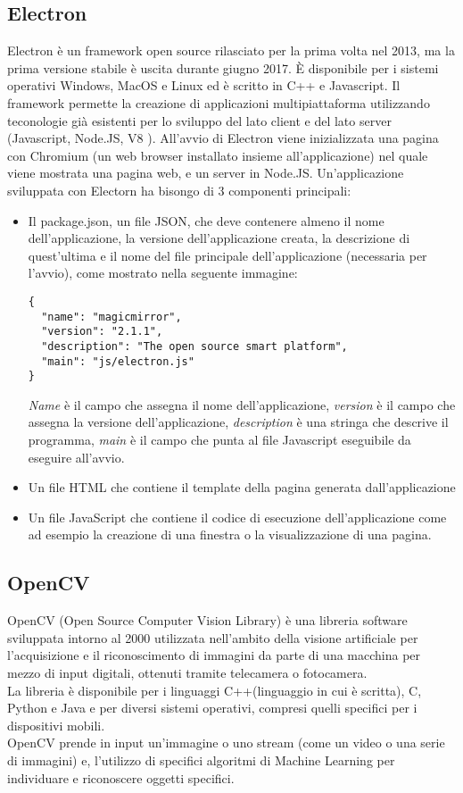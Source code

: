 \subsection{Electron}\label{cap:Electron}
Electron \`e un framework open source rilasciato per la prima volta nel 2013, ma la prima versione
stabile \`e uscita durante giugno 2017. \`E disponibile per i sistemi operativi Windows, MacOS e Linux ed \`e scritto
in C++ e Javascript. Il framework permette la creazione di applicazioni multipiattaforma
utilizzando teconologie gi\`a esistenti per lo sviluppo
del lato client e del lato server (Javascript, Node.JS, V8 \cite{V8}).
All'avvio di Electron viene inizializzata una pagina con Chromium \cite{Chromium}(un web browser installato insieme all'applicazione)
nel quale viene mostrata una pagina web, e un server in Node.JS.
Un'applicazione sviluppata con Electorn ha bisongo di 3 componenti principali:
\begin{itemize}
\item Il package.json, un file JSON, che deve contenere almeno il nome dell'applicazione,
la versione dell'applicazione creata, la descrizione di quest'ultima e il
 nome del file principale dell'applicazione (necessaria per l'avvio), come mostrato nella
 seguente immagine:
\begin{lstlisting}
{
  "name": "magicmirror",
  "version": "2.1.1",
  "description": "The open source smart platform",
  "main": "js/electron.js"
}
\end{lstlisting}
\emph{Name} \`e il campo che assegna il nome dell'applicazione, \emph{version} \`e il campo che assegna la versione
dell'applicazione, \emph{description} \`e una stringa che descrive il programma, \emph{main} \`e il campo che punta al file
Javascript eseguibile da eseguire all'avvio.
\item Un file HTML che contiene il template della pagina generata dall'applicazione
\item Un file JavaScript che contiene il codice di esecuzione dell'applicazione come ad esempio la
creazione di una finestra o la visualizzazione di una pagina.
\end{itemize}

\subsection{OpenCV}
OpenCV (Open Source Computer Vision Library) \`e una libreria software sviluppata intorno al 2000
utilizzata nell'ambito della visione artificiale per l'acquisizione e il riconoscimento di immagini
da parte di una macchina per mezzo di input digitali, ottenuti tramite telecamera o fotocamera.\\
La libreria \`e disponibile per i linguaggi C++(linguaggio in cui \`e scritta), C, Python e Java e
per diversi sistemi operativi, compresi quelli specifici per i dispositivi mobili.\\
OpenCV prende in input un'immagine o uno stream (come un video o una serie di immagini) e, l'utilizzo di
specifici algoritmi di Machine Learning per individuare e riconoscere oggetti specifici.


